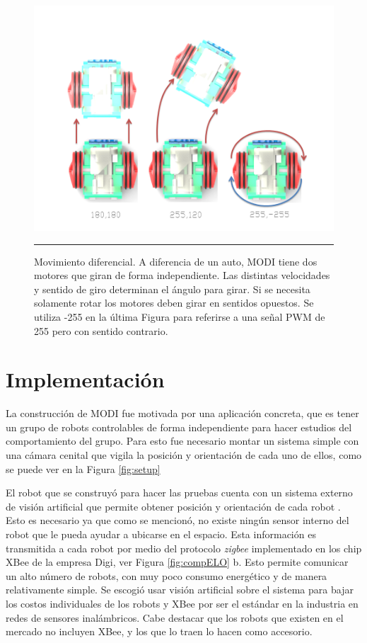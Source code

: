 \begin{figure}[htbp]
	\centering
		\includegraphics[width=\textwidth]{./Figures/MODI/pwm.png}
		\rule{35em}{0.5pt}
	\caption[Señal PWM]{Movimiento diferencial. A diferencia de un auto, MODI tiene dos motores que giran de forma independiente. Las distintas velocidades y sentido de giro determinan el ángulo para girar. Si se necesita solamente rotar los motores deben girar en sentidos opuestos. Se utiliza -255 en la última Figura para referirse a una señal PWM de 255 pero con sentido contrario.}
	\label{fig:pwm}
\end{figure}

\section{Implementación}
La construcción de MODI fue motivada por una aplicación concreta, que es tener un grupo de robots controlables de forma independiente para hacer estudios del comportamiento del grupo. Para esto fue necesario montar un sistema simple con una cámara cenital que vigila  la posición y orientación de cada uno de ellos, como se puede ver en la Figura \ref{fig:setup}

El robot que se construyó para hacer las pruebas cuenta con un sistema externo de visión artificial que permite obtener posición y orientación de cada robot . Esto es necesario ya que como se mencionó, no existe ningún sensor interno del robot que le pueda ayudar a ubicarse en el espacio. Esta información es transmitida a cada robot por medio del protocolo \textit{zigbee} implementado en los chip XBee de la empresa Digi, ver Figura \ref{fig:compELO} b. Esto permite comunicar un alto número de robots, con muy poco consumo energético y de manera relativamente simple. Se escogió usar visión artificial sobre el sistema para bajar los costos individuales de los robots y XBee por ser el estándar en la industria en redes de sensores inalámbricos. Cabe destacar que los robots que existen en el mercado no incluyen XBee, y los que lo traen lo hacen como accesorio. 


